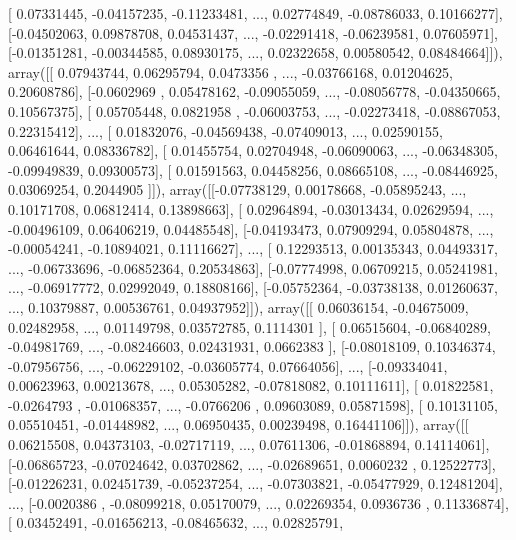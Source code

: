 \documentclass{article}
\begin{document}
       [ 0.07331445, -0.04157235, -0.11233481, ...,  0.02774849,
        -0.08786033,  0.10166277],
       [-0.04502063,  0.09878708,  0.04531437, ..., -0.02291418,
        -0.06239581,  0.07605971],
       [-0.01351281, -0.00344585,  0.08930175, ...,  0.02322658,
         0.00580542,  0.08484664]]), array([[ 0.07943744,  0.06295794,  0.0473356 , ..., -0.03766168,
         0.01204625,  0.20608786],
       [-0.0602969 ,  0.05478162, -0.09055059, ..., -0.08056778,
        -0.04350665,  0.10567375],
       [ 0.05705448,  0.0821958 , -0.06003753, ..., -0.02273418,
        -0.08867053,  0.22315412],
       ..., 
       [ 0.01832076, -0.04569438, -0.07409013, ...,  0.02590155,
         0.06461644,  0.08336782],
       [ 0.01455754,  0.02704948, -0.06090063, ..., -0.06348305,
        -0.09949839,  0.09300573],
       [ 0.01591563,  0.04458256,  0.08665108, ..., -0.08446925,
         0.03069254,  0.2044905 ]]), array([[-0.07738129,  0.00178668, -0.05895243, ...,  0.10171708,
         0.06812414,  0.13898663],
       [ 0.02964894, -0.03013434,  0.02629594, ..., -0.00496109,
         0.06406219,  0.04485548],
       [-0.04193473,  0.07909294,  0.05804878, ..., -0.00054241,
        -0.10894021,  0.11116627],
       ..., 
       [ 0.12293513,  0.00135343,  0.04493317, ..., -0.06733696,
        -0.06852364,  0.20534863],
       [-0.07774998,  0.06709215,  0.05241981, ..., -0.06917772,
         0.02992049,  0.18808166],
       [-0.05752364, -0.03738138,  0.01260637, ...,  0.10379887,
         0.00536761,  0.04937952]]), array([[ 0.06036154, -0.04675009,  0.02482958, ...,  0.01149798,
         0.03572785,  0.1114301 ],
       [ 0.06515604, -0.06840289, -0.04981769, ..., -0.08246603,
         0.02431931,  0.0662383 ],
       [-0.08018109,  0.10346374, -0.07956756, ..., -0.06229102,
        -0.03605774,  0.07664056],
       ..., 
       [-0.09334041,  0.00623963,  0.00213678, ...,  0.05305282,
        -0.07818082,  0.10111611],
       [ 0.01822581, -0.0264793 , -0.01068357, ..., -0.0766206 ,
         0.09603089,  0.05871598],
       [ 0.10131105,  0.05510451, -0.01448982, ...,  0.06950435,
         0.00239498,  0.16441106]]), array([[ 0.06215508,  0.04373103, -0.02717119, ...,  0.07611306,
        -0.01868894,  0.14114061],
       [-0.06865723, -0.07024642,  0.03702862, ..., -0.02689651,
         0.0060232 ,  0.12522773],
       [-0.01226231,  0.02451739, -0.05237254, ..., -0.07303821,
        -0.05477929,  0.12481204],
       ..., 
       [-0.0020386 , -0.08099218,  0.05170079, ...,  0.02269354,
         0.0936736 ,  0.11336874],
       [ 0.03452491, -0.01656213, -0.08465632, ...,  0.02825791,
\end{document}
